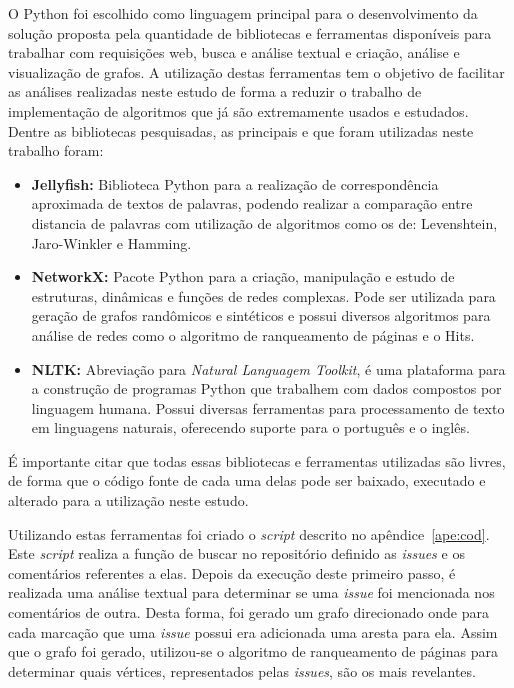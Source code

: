 O Python foi escolhido como linguagem principal para o desenvolvimento da solução proposta pela quantidade de bibliotecas e ferramentas disponíveis para trabalhar com requisições web, busca e análise textual e criação, análise e visualização de grafos. A utilização destas ferramentas tem o objetivo de facilitar as análises realizadas neste estudo de forma a reduzir o trabalho de implementação de algoritmos que já são extremamente usados e estudados. Dentre as bibliotecas pesquisadas, as principais e que foram utilizadas neste trabalho foram:

\begin{itemize}
    \item \textbf{Jellyfish:} Biblioteca Python para a realização de correspondência aproximada de textos de palavras, podendo realizar a comparação entre distancia de palavras com utilização de algoritmos como os de: Levenshtein, Jaro-Winkler e Hamming.
    \item \textbf{NetworkX:} Pacote Python para a criação, manipulação e estudo de estruturas, dinâmicas e funções de redes complexas. Pode ser utilizada para geração de grafos randômicos e sintéticos e possui diversos algoritmos para análise de redes como o algoritmo de ranqueamento de páginas e o Hits.
    \item \textbf{NLTK:} Abreviação para \textit{Natural Languagem Toolkit}, é uma plataforma para a construção de programas Python que trabalhem com dados compostos por linguagem humana. Possui diversas ferramentas para processamento de texto em linguagens naturais, oferecendo suporte para o português e o inglês.
\end{itemize}

É importante citar que todas essas bibliotecas e ferramentas utilizadas são livres, de forma que o código fonte de cada uma delas pode ser baixado, executado e alterado para a utilização neste estudo.

Utilizando estas ferramentas foi criado o \textit{script} descrito no apêndice~\ref{ape:cod}. Este \textit{script} realiza a função de buscar no repositório definido as \textit{issues} e os comentários referentes a elas. Depois da execução deste primeiro passo, é realizada uma análise textual para determinar se uma \textit{issue} foi mencionada nos comentários de outra. Desta forma, foi gerado um grafo direcionado onde para cada marcação que uma \textit{issue} possui era adicionada uma aresta para ela. Assim que o grafo foi gerado, utilizou-se o algoritmo de ranqueamento de páginas para determinar quais vértices, representados pelas \textit{issues}, são os mais revelantes.

